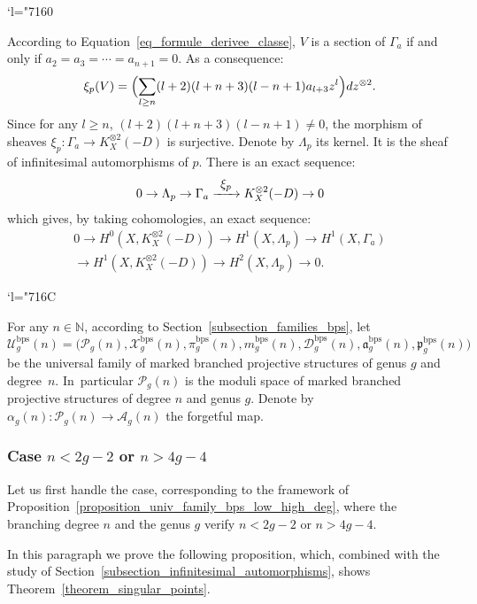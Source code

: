 \documentclass[JEP,XML,SOM,Unicode,NoEqCountersInSection,published]{cedram}
\newcommand{\Changel}{\mathcode`l="7160}
\newcommand{\Changelback}{\mathcode`l="716C}
\newcommand\To[1]{\mathchoice{\xrightarrow{\textstyle\kern4pt#1\kern3pt}}{\stackrel{#1}{\longrightarrow}}{}{}}
\newcommand{\N}{\mathbb N}
\newcommand{\BPS}{\mathrm{bps}}
\theoremstyle{definition}
\theoremstyle{plain}
\begin{document}
\Changel

\noindent
According to Equation~\eqref{eq_formule_derivee_classe}, $V$ is a section of $\Gamma_a$ if and only if \hbox{$a_2 \!=\! a_3 \!=\! \cdots \!=\! a_{n+1} \!=\! 0$}. As a consequence:
\begin{equation}\label{eq_xi_p}
\xi_p(V) = \Bigl(\sum_{l \ge n}(l+2)(l+n+3)(l-n+1)a_{l+3}z^l\Bigr)dz^{\otimes 2}.
\end{equation}
Since for any $l \ge n$, $(l+2)(l+n+3)(l-n+1) \neq 0$, the morphism of sheaves $\xi_p: \Gamma_a \to K_X^{\otimes 2}(-D)$ is surjective.
Denote by $\Lambda_p$ its kernel.
It is the sheaf of infinitesimal automorphisms of $p$.
There is an exact sequence:
\begin{equation*}
0 \to \Lambda_p \to \Gamma_a \To{\xi_p} K_X^{\otimes 2}(-D) \to 0
\end{equation*}
which gives, by taking cohomologies, an exact sequence:
\begin{multline}\label{eq_exact_cohom_struct}
0 \to H^0\left(X, K_X^{\otimes 2}(-D)\right) \to H^1(X, \Lambda_p) \to H^1\left(X, \Gamma_a\right)\\
\to H^1\left(X, K_X^{\otimes 2}(-D)\right) \to H^2(X, \Lambda_p) \to 0.
\end{multline}

\Changelback

For any $n \in \N$, according to Section~\ref{subsection_families_bps}, let
\[
\mathcal U_g^{\BPS}(n) = \bigl(\mathcal P_g(n), \mathcal X_g^{\BPS}(n), \pi_g^{\BPS}(n), m_g^{\BPS}(n), \mathcal D_g^{\BPS}(n), \mathfrak a_g^{\BPS}(n), \mathfrak p_g^{\BPS}(n)\bigr)
\]
be the universal family of marked branched projective structures of genus $g$ and degree~$n$. In~particular $\mathcal P_g(n)$ is the moduli space of marked branched projective structures of degree $n$ and genus $g$.
Denote by $\alpha_g(n): \mathcal P_g(n) \to \mathcal A_g(n)$ the forgetful map.

\subsubsection{Case $n < 2g-2$ or $n > 4g-4$}\label{subsubsection_singular_points_small_high_degree}

Let us first handle the case, corresponding to the framework of Proposition~\ref{proposition_univ_family_bps_low_high_deg}, where the branching degree $n$ and the genus $g$ verify $n < 2g-2$ or $n > 4g-4$.

In this paragraph we prove the following proposition, which, combined with the study of Section~\ref{subsection_infinitesimal_automorphisms}, shows Theorem~\ref{theorem_singular_points}.
\end{document}

